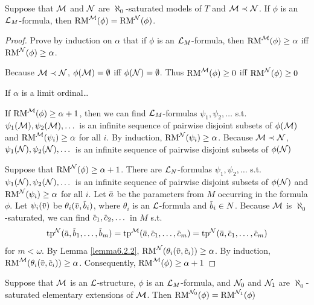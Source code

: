 \documentclass[11pt]{article}
\def \RM {\text{RM}}
\begin{document}
\begin{lemma}[]
\label{lemma6.2.3}
Suppose that \(\mathcal{M}\) and \(\mathcal{N}\) are \(\aleph_0\)-saturated models of \(T\) and \(\mathcal{M}\prec\mathcal{N}\). If \(\phi\) is
an \(\mathcal{L}_M\)-formula, then \(\RM^{\calm}(\phi)=\RM^{\caln}(\phi)\).
\end{lemma}

\begin{proof}
Prove by induction on \(\alpha\) that if \(\phi\) is an \(\mathcal{L}_M\)-formula, then \(\RM^{\calm}(\phi)\ge\alpha\)
iff \(\RM^{\caln}(\phi)\ge\alpha\).

Because \(\mathcal{M}\prec\mathcal{N}\), \(\phi(\mathcal{M})=\emptyset\) iff \(\phi(\mathcal{N})=\emptyset\). Thus \(\RM^{\calm}(\phi)\ge 0\) iff \(\RM^{\caln}(\phi)\ge 0\)

If \(\alpha\) is a limit ordinal\ldots{}

If \(\RM^{\calm}(\phi)\ge\alpha+1\), then we can find \(\mathcal{L}_M\)-formulas \(\psi_1,\psi_2,\dots\) s.t. \(\psi_1(\mathcal{M}),\psi_2(\mathcal{M}),\dots\) is
an infinite sequence of pairwise disjoint subsets of \(\phi(\mathcal{M})\) and \(\RM^{\calm}(\psi_i)\ge\alpha\) for
all \(i\). By induction, \(\RM^{\caln}(\psi_i)\ge\alpha\). Because \(\mathcal{M}\prec\mathcal{N}\), \(\psi_1(\mathcal{N}),\psi_2(\mathcal{N}),\dots\) is an infinite
sequence of pairwise disjoint subsets of \(\phi(\mathcal{N})\)

Suppose that \(\RM^{\caln}(\phi)\ge\alpha+1\). There are  \(\mathcal{L}_N\)-formulas \(\psi_1,\psi_2,\dots\) s.t. \(\psi_1(\mathcal{N}),\psi_2(\mathcal{N}),\dots\) is
an infinite sequence of pairwise disjoint subsets of \(\phi(\mathcal{N})\) and \(\RM^{\caln}(\psi_i)\ge\alpha\) for
all \(i\). Let \(\bara\) be the parameters from \(M\) occurring in the formula \(\phi\).
Let \(\psi_i(\barv)\) be \(\theta_i(\barv,\barb_i)\), where \(\theta_i\) is an \(\mathcal{L}\)-formula and \(\barb_i\in N\).
Because \(\mathcal{M}\) is \(\aleph_0\)-saturated, we can find \(\barc_1,\barc_2,\dots\) in \(M\) s.t.
\begin{equation*}
\tp^{\caln}(\bara,\barb_1,\dots,\barb_m)=\tp^{\calm}(\bara,\barc_1,\dots,\barc_m)=\tp^{\caln}(\bara,\barc_1,\dots,\barc_m)
\end{equation*}
for \(m<\omega\). By Lemma \ref{lemma6.2.2}, \(\RM^{\caln}(\theta_i(\barv,\barc_i))\ge\alpha\). By
induction, \(\RM^{\calm}(\theta_i(\barv,\barc_i))\ge\alpha\). Consequently, \(\RM^{\calm}(\phi)\ge\alpha+1\)
\end{proof}

\begin{corollary}[]
\label{cor6.2.4}
Suppose that \(\mathcal{M}\) is an \(\mathcal{L}\)-structure, \(\phi\) is an \(\mathcal{L}_M\)-formula, and \(\mathcal{N}_0\) and \(\mathcal{N}_1\)
are \(\aleph_0\)-saturated elementary extensions of \(\mathcal{M}\). Then \(\RM^{\caln_0}(\phi)=\RM^{\caln_1}(\phi)\)
\end{corollary}
\end{document}
